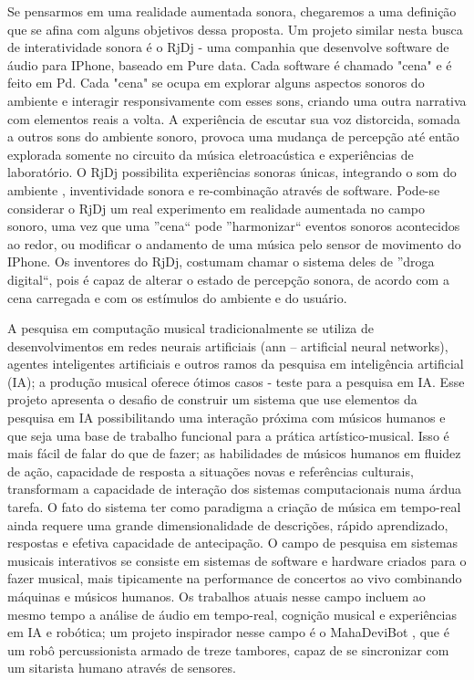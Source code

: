 \documentclass{ppgmus}
\begin{document}
    
Se pensarmos em uma realidade aumentada sonora, chegaremos a uma definição que se afina 
com alguns objetivos dessa proposta.
Um projeto similar nesta busca de interatividade sonora é o RjDj - uma companhia que desenvolve 
software de áudio para IPhone, baseado em Pure data. Cada software 
é chamado "cena" e é feito em Pd. Cada "cena" se ocupa em explorar alguns 
aspectos sonoros do ambiente e interagir responsivamente com esses sons, criando uma 
outra narrativa com elementos reais a volta. A experiência de escutar sua voz distorcida,
somada a outros sons do ambiente sonoro, provoca uma mudança de percepção até então 
explorada somente no circuito da música eletroacústica e experiências de laboratório. 
O RjDj possibilita experiências sonoras únicas, integrando o som do ambiente , 
inventividade sonora e re-combinação através de software. Pode-se considerar o 
RjDj um real experimento em realidade aumentada no campo sonoro, uma vez que uma ''cena``
pode ''harmonizar`` eventos sonoros acontecidos ao redor, ou modificar o andamento de
uma música pelo sensor de movimento do IPhone. Os inventores do RjDj, costumam chamar 
o sistema deles de ''droga digital``, pois é capaz de alterar o estado de percepção sonora,
de acordo com a cena carregada e com os estímulos do ambiente e do usuário. 



A pesquisa em computação musical tradicionalmente se utiliza de
desenvolvimentos em redes neurais artificiais (ann – artificial neural
networks), agentes inteligentes artificiais e outros ramos da pesquisa
em inteligência artificial (IA); a produção musical oferece ótimos
casos - teste para a pesquisa em IA. Esse projeto apresenta o desafio
de construir um sistema que use elementos da pesquisa em IA
possibilitando uma interação próxima com músicos humanos e que seja
uma base de trabalho funcional para a prática artístico-musical. Isso
é mais fácil de falar do que de fazer; as habilidades de músicos
humanos em fluidez de ação, capacidade de resposta a situações novas e
referências culturais, transformam a capacidade de interação dos
sistemas computacionais numa árdua tarefa. O fato do sistema ter como
paradigma a criação de música em tempo-real ainda requere uma grande
dimensionalidade de descrições, rápido aprendizado, respostas e
efetiva capacidade de antecipação. O campo de pesquisa em sistemas
musicais interativos\cite{rowe93:interactive} se consiste em sistemas de software e
hardware criados para o fazer musical, mais tipicamente na performance
de concertos ao vivo combinando máquinas e músicos humanos. Os
trabalhos atuais nesse campo incluem ao mesmo tempo a análise de áudio
em tempo-real, cognição musical e experiências em IA e robótica; um
projeto inspirador nesse campo é o MahaDeviBot \cite{kapur07:integrating}, que
é um robô percussionista armado de treze tambores, capaz de se
sincronizar com um sitarista humano através de sensores.
\end{document}
